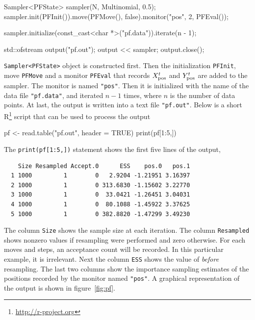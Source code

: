\begin{cppcode}
    Sampler<PFState> sampler(N, Multinomial, 0.5);
    sampler.init(PFInit()).move(PFMove(), false).monitor("pos", 2, PFEval());

    sampler.initialize(const_cast<char *>("pf.data")).iterate(n - 1);

    std::ofstream output("pf.out");
    output << sampler;
    output.close();
\end{cppcode}
\verb|Sampler<PFState>| object is constructed first. Then the initialization
\verb|PFInit|, move \verb|PFMove| and a monitor \verb|PFEval| that records
$X_{\mathrm{pos}}^t$ and $Y_{\mathrm{pos}}^t$ are added to the sampler. The monitor is named
\verb|"pos"|. Then it is initialized with the name of the data file
\verb|"pf.data"|, and iterated $n - 1$ times, where $n$ is the number of data
points. At last, the output is written into a text file \verb|"pf.out"|. Below
is a short R\footnote{\url{http://r-project.org}} script that can be used to
process the output
\begin{rcode}
  pf <- read.table("pf.out", header = TRUE)
  print(pf[1:5,])
\end{rcode}
The \verb|print(pf[1:5,])| statement shows the first five lines of the output,
\begin{Verbatim}
    Size Resampled Accept.0      ESS    pos.0   pos.1
  1 1000         1        0   2.9204 -1.21951 3.16397
  2 1000         1        0 313.6830 -1.15602 3.22770
  3 1000         1        0  33.0421 -1.26451 3.04031
  4 1000         1        0  80.1088 -1.45922 3.37625
  5 1000         1        0 382.8820 -1.47299 3.49230
\end{Verbatim}
The column \verb|Size| shows the sample size at each iteration. The column
\verb|Resampled| shows nonzero values if resampling were performed and zero
otherwise. For each moves and \mcmc steps, an acceptance count will be
recorded. In this particular example, it is irrelevant. Next the column
\verb|ESS| shows the value of \ess \emph{before} resampling. The last two
columns show the importance sampling estimates of the positions recorded by the
monitor named \verb|"pos"|. A graphical representation of the output is shown
in figure~\ref{fig:pf}.

